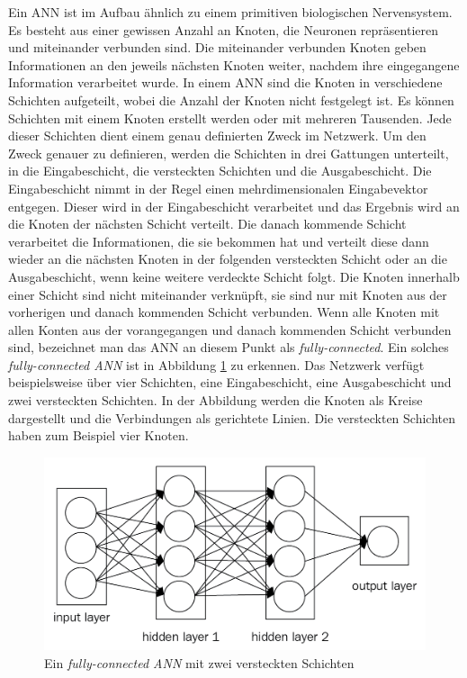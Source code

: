 Ein ANN ist im Aufbau ähnlich zu einem primitiven biologischen Nervensystem. Es besteht aus einer gewissen Anzahl an Knoten, die Neuronen repräsentieren und miteinander verbunden sind. Die miteinander verbunden Knoten geben Informationen an den jeweils nächsten Knoten weiter, nachdem ihre eingegangene Information verarbeitet wurde.
In einem ANN sind die Knoten in verschiedene Schichten aufgeteilt, wobei die Anzahl der Knoten nicht festgelegt ist. Es können Schichten mit einem Knoten erstellt werden oder mit mehreren Tausenden. Jede dieser Schichten dient einem genau definierten Zweck im Netzwerk. Um den Zweck genauer zu definieren, werden die Schichten in drei Gattungen unterteilt, in die Eingabeschicht, die versteckten Schichten und die Ausgabeschicht. Die Eingabeschicht nimmt in der Regel einen mehrdimensionalen Eingabevektor entgegen. Dieser wird in der Eingabeschicht verarbeitet und das Ergebnis wird an die Knoten der nächsten Schicht verteilt. Die danach kommende Schicht verarbeitet die Informationen, die sie bekommen hat und verteilt diese dann wieder an die nächsten Knoten in der folgenden versteckten Schicht oder an die Ausgabeschicht, wenn keine weitere verdeckte Schicht folgt.
Die Knoten innerhalb einer Schicht sind nicht miteinander verknüpft, sie sind nur mit Knoten aus der vorherigen und danach kommenden Schicht verbunden. Wenn alle Knoten mit allen Konten aus der vorangegangen und danach kommenden Schicht verbunden sind, bezeichnet man das ANN an diesem Punkt als \textit{fully-connected}. Ein solches \textit{fully-connected ANN} ist in Abbildung \ref{fig:ful_con_ann} zu erkennen. Das Netzwerk verfügt beispielsweise über vier Schichten, eine Eingabeschicht, eine Ausgabeschicht und zwei versteckten Schichten. In der Abbildung werden die Knoten als Kreise dargestellt und die Verbindungen als gerichtete Linien. Die versteckten Schichten haben zum Beispiel vier Knoten.
\cite*{Keiron2015}

\begin{figure}[H]
    \centering
    \includegraphics[width=\imgMed]{images/theory/neural_network.png}
    \caption{Ein \textit{fully-connected ANN} mit zwei versteckten Schichten \cite{Sewak2018}}
    \label{fig:ful_con_ann}
\end{figure}

